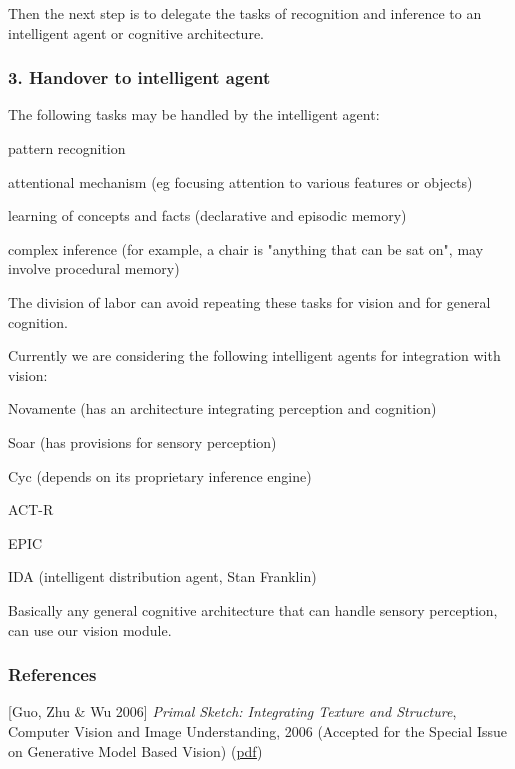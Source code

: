  Then the next step is to delegate the tasks of recognition and inference to an intelligent agent or cognitive architecture.

\subsubsection{3. Handover to intelligent agent}

The following tasks may be handled by the intelligent agent:
\begin{compactenum}
	\item pattern recognition
	\item attentional mechanism (eg focusing attention to various features or objects)
	\item learning of concepts and facts (declarative and episodic memory)
	\item complex inference (for example, a chair is "anything that can be sat on", may involve procedural memory)
\end{compactenum}

The division of labor can avoid repeating these tasks for vision and for general cognition.

Currently we are considering the following intelligent agents for integration with vision:
\begin{compactenum}
	\item Novamente (has an architecture integrating perception and cognition)
	\item Soar (has provisions for sensory perception)
	\item Cyc (depends on its proprietary inference engine)
	\item ACT-R
	\item EPIC
	\item IDA (intelligent distribution agent, Stan Franklin)
\end{compactenum}

Basically any general cognitive architecture that can handle sensory perception, can use our vision module.

\subsubsection{References}

[Guo,  Zhu \& Wu 2006] \emph{Primal Sketch: Integrating Texture and Structure}, 
Computer Vision and Image Understanding, 2006 (Accepted for the Special Issue on Generative Model Based Vision) (\href{http://www.stat.ucla.edu/~sczhu/papers/primal_sketch.pdf}{pdf})

